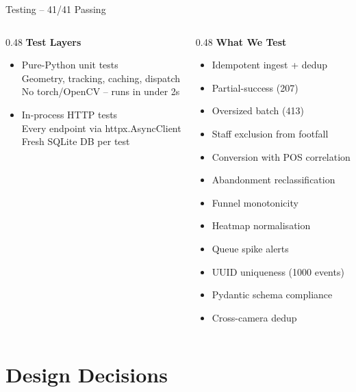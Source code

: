\documentclass[aspectratio=169, 11pt]{beamer}
\begin{document}
\begin{frame}{Testing -- 41/41 Passing}
  \begin{columns}[T]
    \begin{column}{0.48\textwidth}
      \textbf{Test Layers}
      \begin{itemize}
        \item Pure-Python unit tests\\
          {\small Geometry, tracking, caching, dispatch}\\
          {\small No torch/OpenCV -- runs in under 2s}

        \vspace{0.2cm}
        \item In-process HTTP tests\\
          {\small Every endpoint via httpx.AsyncClient}\\
          {\small Fresh SQLite DB per test}
      \end{itemize}
    \end{column}
    \begin{column}{0.48\textwidth}
      \textbf{What We Test}
      \begin{itemize}
        \item Idempotent ingest + dedup
        \item Partial-success (207)
        \item Oversized batch (413)
        \item Staff exclusion from footfall
        \item Conversion with POS correlation
        \item Abandonment reclassification
        \item Funnel monotonicity
        \item Heatmap normalisation
        \item Queue spike alerts
        \item UUID uniqueness (1000 events)
        \item Pydantic schema compliance
        \item Cross-camera dedup
      \end{itemize}
    \end{column}
  \end{columns}
\end{frame}

\section{Design Decisions}
\end{document}
